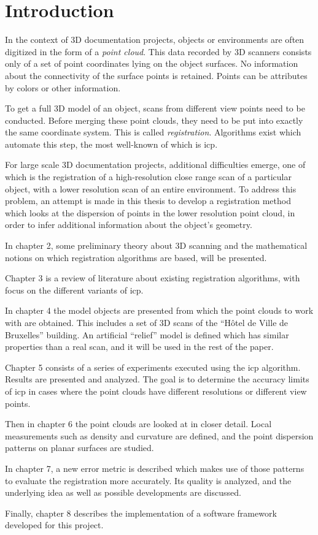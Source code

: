 \chapter{Introduction}
In the context of 3D documentation projects, objects or environments are often digitized in the form of a \emph{point cloud}. This data recorded by 3D scanners consists only of a set of point coordinates lying on the object surfaces. No information about the connectivity of the surface points is retained. Points can be attributes by colors or other information.

To get a full 3D model of an object, scans from different view points need to be conducted. Before merging these point clouds, they need to be put into exactly the same coordinate system. This is called \emph{registration}. Algorithms exist which automate this step, the most well-known of which is \gls{icp}.

For large scale 3D documentation projects, additional difficulties emerge, one of which is the registration of a high-resolution close range scan of a particular object, with a lower resolution scan of an entire environment. To address this problem, an attempt is made in this thesis to develop a registration method which looks at the dispersion of points in the lower resolution point cloud, in order to infer additional information about the object's geometry.

In chapter 2, some preliminary theory about 3D scanning and the mathematical notions on which registration algorithms are based, will be presented.

Chapter 3 is a review of literature about existing registration algorithms, with focus on the different variants of \gls{icp}.

In chapter 4 the model objects are presented from which the point clouds to work with are obtained. This includes a set of 3D scans of the ``Hôtel de Ville de Bruxelles'' building. An artificial ``relief'' model is defined which has similar properties than a real scan, and it will be used in the rest of the paper.

Chapter 5 consists of a series of experiments executed using the \gls{icp} algorithm. Results are presented and analyzed. The goal is to determine the accuracy limits of \gls{icp} in cases where the point clouds have different resolutions or different view points.

Then in chapter 6 the point clouds are looked at in closer detail. Local measurements such as density and curvature are defined, and the point dispersion patterns on planar surfaces are studied.

In chapter 7, a new error metric is described which makes use of those patterns to evaluate the registration more accurately. Its quality is analyzed, and the underlying idea as well as possible developments are discussed.

Finally, chapter 8 describes the \cpp{} implementation of a software framework developed for this project.
